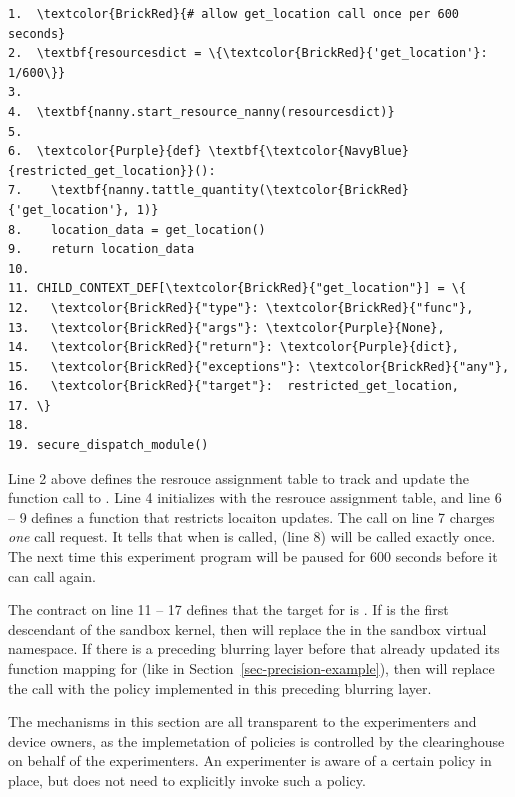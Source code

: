 \begin{Verbatim}
1.  \textcolor{BrickRed}{# allow get_location call once per 600 seconds}
2.  \textbf{resourcesdict = \{\textcolor{BrickRed}{'get_location'}: 1/600\}} 
3.
4.  \textbf{nanny.start_resource_nanny(resourcesdict)}
5.
6.  \textcolor{Purple}{def} \textbf{\textcolor{NavyBlue}{restricted_get_location}}():
7.    \textbf{nanny.tattle_quantity(\textcolor{BrickRed}{'get_location'}, 1)}
8.    location_data = get_location()
9.    return location_data
10.
11. CHILD_CONTEXT_DEF[\textcolor{BrickRed}{"get_location"}] = \{
12.   \textcolor{BrickRed}{"type"}: \textcolor{BrickRed}{"func"},
13.   \textcolor{BrickRed}{"args"}: \textcolor{Purple}{None},
14.   \textcolor{BrickRed}{"return"}: \textcolor{Purple}{dict},
15.   \textcolor{BrickRed}{"exceptions"}: \textcolor{BrickRed}{"any"},
16.   \textcolor{BrickRed}{"target"}:  restricted_get_location,
17. \}
18. 
19. secure_dispatch_module()
\end{Verbatim}

Line 2 above defines the resrouce assignment table to track and update 
the function call to . Line 4 initializes  
with the resrouce assignment table, and line 6 -- 9 defines a 
function  that restricts locaiton updates. 
The  call on line 7 charges \textit{one}  call 
request. It tells  that when  
is called,  (line 8) will be called exactly once. The
next time this experiment program 
will be paused for 600 seconds before it can call  again.

The contract on line 11 -- 17 defines that the target
for  is . If 
 is the first descendant of the sandbox kernel, then
 will replace the 
in the sandbox virtual namespace. If there is a preceding blurring layer 
before  that already updated its 
function mapping for  (like   
in Section~\ref{sec-precision-example}), then
 will replace the  call
with the policy implemented in this preceding blurring layer.

\smallskip
The mechanisms in this section are all transparent to the experimenters 
and device owners, as the implemetation of policies is controlled by the 
clearinghouse on behalf of the experimenters. An experimenter is aware 
of a certain policy in place, but does not need to explicitly invoke such a 
policy. 